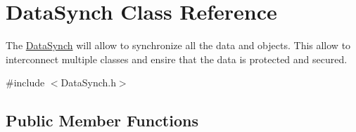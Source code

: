 \hypertarget{classDataSynch}{}\section{Data\+Synch Class Reference}
\label{classDataSynch}


The \hyperlink{classDataSynch}{Data\+Synch} will allow to synchronize all the data and objects. This allow to interconnect multiple classes and ensire that the data is protected and secured.  




{\ttfamily \#include $<$Data\+Synch.\+h$>$}

\subsection*{Public Member Functions}
